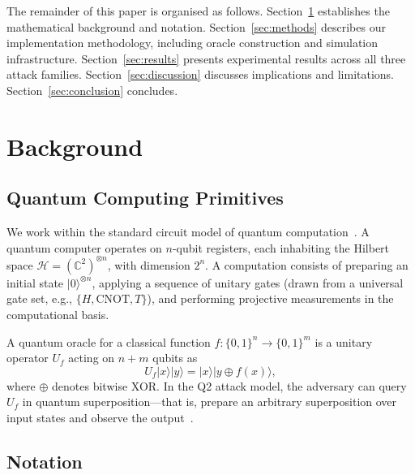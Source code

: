 \documentclass[11pt,a4paper]{article}
\begin{document}
The remainder of this paper is organised as follows.
Section~\ref{sec:background} establishes the mathematical background and
notation.  Section~\ref{sec:methods} describes our implementation
methodology, including oracle construction and simulation infrastructure.
Section~\ref{sec:results} presents experimental results across all three
attack families.  Section~\ref{sec:discussion} discusses implications and
limitations.  Section~\ref{sec:conclusion} concludes.


\section{Background}\label{sec:background}

\subsection{Quantum Computing Primitives}

We work within the standard circuit model of quantum
computation~\cite{NielsenChuang2010}.  A quantum computer operates on
$n$-qubit registers, each inhabiting the Hilbert space
$\mathcal{H}=(\mathbb{C}^2)^{\otimes n}$, with dimension $2^n$.  A
computation consists of preparing an initial state
$|0\rangle^{\otimes n}$, applying a sequence of unitary gates (drawn from
a universal gate set, e.g., $\{H, \text{CNOT}, T\}$), and performing
projective measurements in the computational basis.

A quantum oracle for a classical function $f:\{0,1\}^n\to\{0,1\}^m$ is a
unitary operator $U_f$ acting on $n+m$ qubits as
\begin{equation}\label{eq:oracle}
    U_f |x\rangle|y\rangle = |x\rangle|y \oplus f(x)\rangle,
\end{equation}
where $\oplus$ denotes bitwise XOR.  In the Q2 attack model, the
adversary can query $U_f$ in quantum superposition---that is, prepare an
arbitrary superposition over input states and observe the
output~\cite{BonehZhandry2013, Gagliardoni2016}.

\subsection{Notation}
\end{document}
